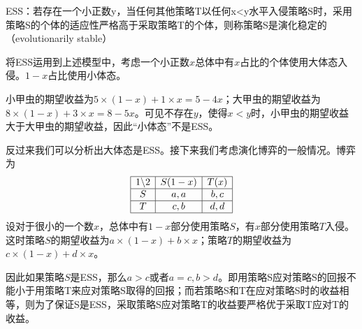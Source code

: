 \documentclass[UTF8,12pt]{ctexart}
\numberwithin{equation}{section} %
\numberwithin{figure}{section}
\numberwithin{table}{section}
\begin{document}
	ESS：若存在一个小正数y，当任何其他策略T以任何x<y水平入侵策略S时，采用策略S的个体的适应性严格高于采取策略T的个体，则称策略S是演化稳定的（evolutionarily stable）
	
	将ESS运用到上述模型中，考虑一个小正数$x$总体中有$x$占比的个体使用大体态入侵。$1-x$占比使用小体态。
	
	小甲虫的期望收益为$5 \times (1-x) + 1 \times x = 5 - 4x$；大甲虫的期望收益为$8 \times (1-x) + 3 \times x = 8 - 5x$。可见不存在$y$，使得$x < y$时，小甲虫的期望收益大于大甲虫的期望收益，因此“小体态”不是ESS。
	
	反过来我们可以分析出大体态是ESS。接下来我们考虑演化博弈的一般情况。博弈为
	\begin{equation}
		\begin{array}{|c|c|c|}
			\hline
			1 \backslash 2 & S(1-x) & T(x) \\
			\hline
			S & a,a & b,c \\
			\hline
			T & c,b & d,d \\
			\hline
		\end{array}
	\end{equation}
	设对于很小的一个数$x$，总体中有$1-x$部分使用策略$S$，有$x$部分使用策略$T$入侵。这时策略$S$的期望收益为$a \times (1-x) + b \times x$；策略$T$的期望收益为$c \times (1-x) + d \times x$。
	
	因此如果策略$S$是ESS，那么$a>c$或者$a=c,b > d$。即用策略S应对策略S的回报不能小于用策略T来应对策略S取得的回报；而若策略S和T在应对策略S时的收益相等，则为了保证S是ESS，采取策略S应对策略T的收益要严格优于采取T应对T的收益。
	
	\newpage
	
\end{document}
